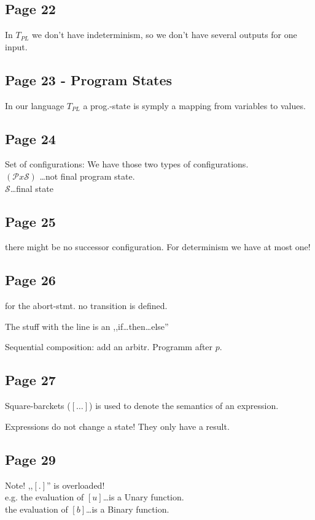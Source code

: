 \documentclass[a4paper]{article}
\newcommand{\TPL}{T_{PL}}
\begin{document}
\subsection{Page 22}
In $\TPL$ we don't have indeterminism, so we don't have several outputs for one
input.

\subsection{Page 23 - Program States}
In our language $\TPL$ a prog.-state is symply a mapping from variables to
values.

\subsection{Page 24}
Set of configurations: We have those two types of configurations.\\
$(\mathcal{P} x \mathcal{S})$ \ldots not final program state.\\
$\mathcal{S}$\ldots final state



\subsection{Page 25} there might be no successor configuration. For determinism
we have at most one!

\subsection{Page 26} for the abort-stmt. no transition is defined.

The stuff with the line is an ,,if\ldots then\ldots else''

Sequential composition: add an arbitr. Programm after $p$.

\subsection{Page 27}
Square-barckets ($[\ldots]$) is used to denote the semantics of an expression.

Expressions do not change a state! They only have a result.


\subsection{Page 29} Note! ,,$[.]$'' is overloaded!\\
e.g. the evaluation of $[u]$\ldots is a Unary function.\\
the evaluation of $[b]$\ldots is a Binary function.\\
\end{document}
